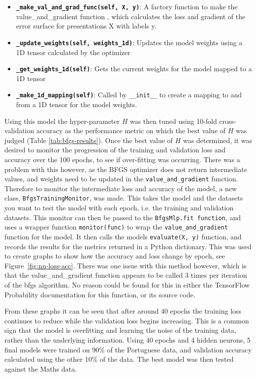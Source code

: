 \documentclass[12pt,a4paper,titlepage,twoside]{report}
\begin{document}
	\begin{itemize}
		\item \textbf{\texttt{_make_val_and_grad_func(self, X, y)}}: A factory function to make the value_and_gradient function , which calculates the loss and gradient of the error surface for presentations X with labels y.
		\item \textbf{\texttt{_update_weights(self, weights_1d)}}: Updates the model weights using a 1D tensor calculated by the optimizer
		\item \textbf{\texttt{_get_weights_1d(self)}}: Gets the current weights for the model mapped to a 1D tensor
		\item \textbf{\texttt{_make_1d_mapping(self)}}: Called by \texttt{__init__} to create a mapping to and from a 1D tensor for the model weights.
	\end{itemize}
	Using this model the hyper-parameter $H$ was then tuned using 10-fold cross-validation accuracy as the performance metric on which the best value of $H$ was judged (Table \ref{tab:bfgs-results}). Once the best value of $H$ was determined, it was desired to monitor the progression of the training and validation loss and accuracy over the 100 epochs, to see if over-fitting was occurring. There was a problem with this however, as the BFGS optimizer does not return intermediate values, and weights need to be updated in the \texttt{value_and_gradient} function. Therefore to monitor the intermediate loss and accuracy of the model, a new class, \texttt{BfgsTrainingMonitor}, was made. This takes the model and the datasets you want to test the model with each epoch, i.e. the training and validation datasets. This monitor can then be passed to the \texttt{BfgsMlp.fit function}, and uses a wrapper function \texttt{monitor(func)} to wrap the \texttt{value_and_gradient} function for the model. It then calls the models \texttt{evaluate(X, y)} function, and records the results for the metrics returned in a Python dictionary. This was used to create graphs to show how the accuracy and loss change by epoch, see Figure~\ref{fig:nn-loss-acc}. There was one issue with this method however, which is that the value_and_gradient function appears to be called 3 times per iteration of the bfgs algorithm. No reason could be found for this in either the TensorFlow Probability documentation for this function, or its source code. \par
	From these graphs it can be seen that after around 40 epochs the training loss continues to reduce while the validation loss begins increasing. This is a common sign that the model is overfitting and learning the noise of the training data, rather than the underlying information\cite{overfitting}. Using 40 epochs and 4 hidden neurons, 5 final models were trained on 90\% of the Portuguese data, and validation accuracy calculated using the other 10\% of the data. The best model was then tested against the Maths data.
	
\end{document}
